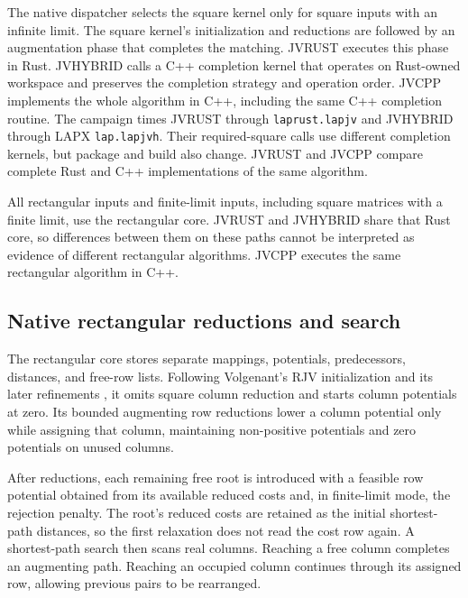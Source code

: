 \documentclass[11pt,a4paper]{article}
\begin{document}
The native dispatcher selects the square kernel only for square inputs with an infinite limit. The square kernel's initialization and reductions are followed by an augmentation phase that completes the matching. JVRUST executes this phase in Rust. JVHYBRID calls a C++ completion kernel that operates on Rust-owned workspace and preserves the completion strategy and operation order. JVCPP implements the whole algorithm in C++, including the same C++ completion routine. The campaign times JVRUST through \texttt{laprust.lapjv} and JVHYBRID through LAPX \texttt{lap.lapjvh}. Their required-square calls use different completion kernels, but package and build also change. JVRUST and JVCPP compare complete Rust and C++ implementations of the same algorithm.

All rectangular inputs and finite-limit inputs, including square matrices with a finite limit, use the rectangular core. JVRUST and JVHYBRID share that Rust core, so differences between them on these paths cannot be interpreted as evidence of different rectangular algorithms. JVCPP executes the same rectangular algorithm in C++.

\subsection{Native rectangular reductions and search}

The rectangular core stores separate mappings, potentials, predecessors, distances, and free-row lists. Following Volgenant's RJV initialization \cite{volgenant1996} and its later refinements \cite{bijsterbosch2010}, it omits square column reduction and starts column potentials at zero. Its bounded augmenting row reductions lower a column potential only while assigning that column, maintaining non-positive potentials and zero potentials on unused columns.

After reductions, each remaining free root is introduced with a feasible row potential obtained from its available reduced costs and, in finite-limit mode, the rejection penalty. The root's reduced costs are retained as the initial shortest-path distances, so the first relaxation does not read the cost row again. A shortest-path search then scans real columns. Reaching a free column completes an augmenting path. Reaching an occupied column continues through its assigned row, allowing previous pairs to be rearranged.
\end{document}
